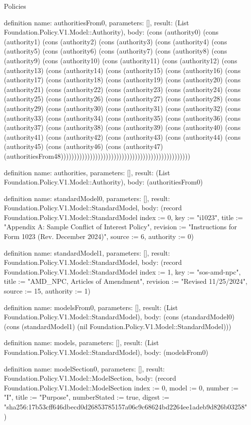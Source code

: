\begin{lexlean}{Policies}
\begin{semanticmodule}
definition{
  name: authoritiesFrom0,
  parameters: [],
  result: (List Foundation.Policy.V1.Model::Authority),
  body: (cons (authority0) (cons (authority1) (cons (authority2) (cons (authority3) (cons (authority4) (cons (authority5) (cons (authority6) (cons (authority7) (cons (authority8) (cons (authority9) (cons (authority10) (cons (authority11) (cons (authority12) (cons (authority13) (cons (authority14) (cons (authority15) (cons (authority16) (cons (authority17) (cons (authority18) (cons (authority19) (cons (authority20) (cons (authority21) (cons (authority22) (cons (authority23) (cons (authority24) (cons (authority25) (cons (authority26) (cons (authority27) (cons (authority28) (cons (authority29) (cons (authority30) (cons (authority31) (cons (authority32) (cons (authority33) (cons (authority34) (cons (authority35) (cons (authority36) (cons (authority37) (cons (authority38) (cons (authority39) (cons (authority40) (cons (authority41) (cons (authority42) (cons (authority43) (cons (authority44) (cons (authority45) (cons (authority46) (cons (authority47) (authoritiesFrom48)))))))))))))))))))))))))))))))))))))))))))))))))
}

definition{
  name: authorities,
  parameters: [],
  result: (List Foundation.Policy.V1.Model::Authority),
  body: (authoritiesFrom0)
}

definition{
  name: standardModel0,
  parameters: [],
  result: Foundation.Policy.V1.Model::StandardModel,
  body: (record Foundation.Policy.V1.Model::StandardModel {index := 0, key := "i1023", title := "Appendix A: Sample Conflict of Interest Policy", revision := "Instructions for Form 1023 (Rev. December 2024)", source := 6, authority := 0})
}

definition{
  name: standardModel1,
  parameters: [],
  result: Foundation.Policy.V1.Model::StandardModel,
  body: (record Foundation.Policy.V1.Model::StandardModel {index := 1, key := "sos-amd-npc", title := "AMD_NPC, Articles of Amendment", revision := "Revised 11/25/2024", source := 15, authority := 1})
}

definition{
  name: modelsFrom0,
  parameters: [],
  result: (List Foundation.Policy.V1.Model::StandardModel),
  body: (cons (standardModel0) (cons (standardModel1) (nil Foundation.Policy.V1.Model::StandardModel)))
}

definition{
  name: models,
  parameters: [],
  result: (List Foundation.Policy.V1.Model::StandardModel),
  body: (modelsFrom0)
}

definition{
  name: modelSection0,
  parameters: [],
  result: Foundation.Policy.V1.Model::ModelSection,
  body: (record Foundation.Policy.V1.Model::ModelSection {index := 0, model := 0, number := "I", title := "Purpose", numberStated := true, digest := "sha256:17b53cff646dbecd0d26853785157a06c9c68624bd2264ee1adeb9d826b03258"})
}


\end{semanticmodule}
\end{lexlean}
